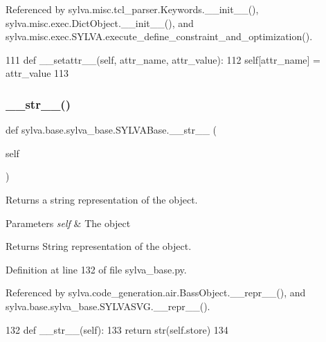 Referenced by sylva.\+misc.\+tcl\+\_\+parser.\+Keywords.\+\_\+\+\_\+init\+\_\+\+\_\+(), sylva.\+misc.\+exec.\+Dict\+Object.\+\_\+\+\_\+init\+\_\+\+\_\+(), and sylva.\+misc.\+exec.\+S\+Y\+L\+V\+A.\+execute\+\_\+define\+\_\+constraint\+\_\+and\+\_\+optimization().


\begin{DoxyCode}
111     \textcolor{keyword}{def }\_\_setattr\_\_(self, attr\_name, attr\_value):
112         self[attr\_name] = attr\_value
113 
\end{DoxyCode}
\mbox{\label{classsylva_1_1base_1_1sylva__base_1_1_s_y_l_v_a_base_a6c1ed8e83c61ea8a6035b5e4460989f3}} 
\subsubsection{\texorpdfstring{\+\_\+\+\_\+str\+\_\+\+\_\+()}{\_\_str\_\_()}}
{\footnotesize\ttfamily def sylva.\+base.\+sylva\+\_\+base.\+S\+Y\+L\+V\+A\+Base.\+\_\+\+\_\+str\+\_\+\+\_\+ (\begin{DoxyParamCaption}\item[{}]{self }\end{DoxyParamCaption})}



Returns a string representation of the object. 


\begin{DoxyParams}{Parameters}
{\em self} & The object\\
\hline
\end{DoxyParams}
\begin{DoxyReturn}{Returns}
String representation of the object. 
\end{DoxyReturn}


Definition at line 132 of file sylva\+\_\+base.\+py.



Referenced by sylva.\+code\+\_\+generation.\+air.\+Bass\+Object.\+\_\+\+\_\+repr\+\_\+\+\_\+(), and sylva.\+base.\+sylva\+\_\+base.\+S\+Y\+L\+V\+A\+S\+V\+G.\+\_\+\+\_\+repr\+\_\+\+\_\+().


\begin{DoxyCode}
132     \textcolor{keyword}{def }\_\_str\_\_(self):
133         \textcolor{keywordflow}{return} str(self.store)
134 
\end{DoxyCode}
\mbox{\label{classsylva_1_1base_1_1sylva__base_1_1_s_y_l_v_a_base_a4b28a6df0e18ab256c21493b49a64b22}} 
